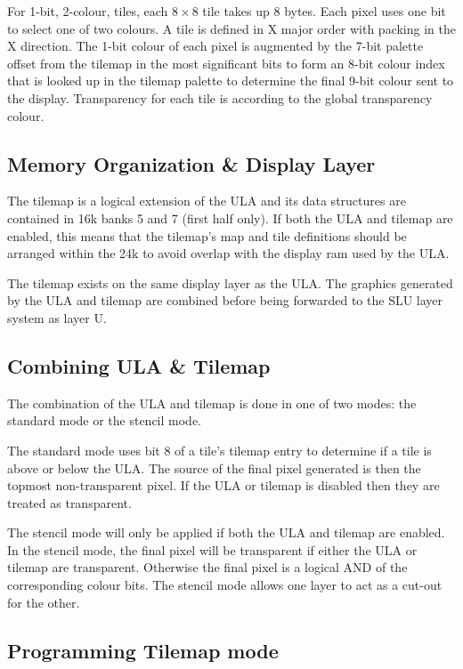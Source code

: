 For 1-bit, 2-colour, tiles, each $8\times8$ tile takes up 8
bytes. Each pixel uses one bit to select one of two colours. A tile is
defined in X major order with packing in the X direction. The 1-bit
colour of each pixel is augmented by the 7-bit palette offset from the
tilemap in the most significant bits to form an 8-bit colour index
that is looked up in the tilemap palette to determine the final 9-bit
colour sent to the display. Transparency for each tile is according to
the global transparency colour.

\subsection{Memory Organization \& Display Layer}
The tilemap is a logical extension of the ULA and its data structures
are contained in 16k banks 5 and 7 (first half only). If both the ULA
and tilemap are enabled, this means that the tilemap's map and tile
definitions should be arranged within the 24k to avoid overlap with
the display ram used by the ULA.

The tilemap exists on the same display layer as the ULA. The graphics
generated by the ULA and tilemap are combined before being forwarded
to the SLU layer system as layer U.

\subsection{Combining ULA \& Tilemap}
The combination of the ULA and tilemap is done in one of two modes:
the standard mode or the stencil mode.

The standard mode uses bit 8 of a tile's tilemap entry to determine if
a tile is above or below the ULA. The source of the final pixel
generated is then the topmost non-transparent pixel. If the ULA or
tilemap is disabled then they are treated as transparent.

The stencil mode will only be applied if both the ULA and tilemap are
enabled. In the stencil mode, the final pixel will be transparent if
either the ULA or tilemap are transparent. Otherwise the final pixel
is a logical AND of the corresponding colour bits. The stencil mode
allows one layer to act as a cut-out for the other.

\subsection{Programming Tilemap mode}




